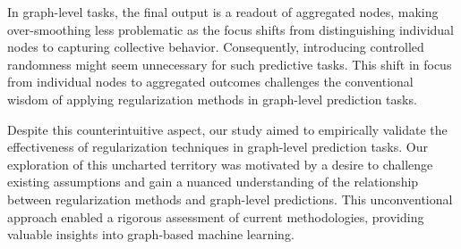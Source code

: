 In graph-level tasks, the final output is a readout of aggregated nodes, making over-smoothing less problematic as the focus shifts from distinguishing individual nodes to capturing collective behavior. Consequently, introducing controlled randomness might seem unnecessary for such predictive tasks. This shift in focus from individual nodes to aggregated outcomes challenges the conventional wisdom of applying regularization methods in graph-level prediction tasks.

Despite this counterintuitive aspect, our study aimed to empirically validate the effectiveness of regularization techniques in graph-level prediction tasks. Our exploration of this uncharted territory was motivated by a desire to challenge existing assumptions and gain a nuanced understanding of the relationship between regularization methods and graph-level predictions. This unconventional approach enabled a rigorous assessment of current methodologies, providing valuable insights into graph-based machine learning.

\newcommand*{\addstd}[4]{
    \addplot[name path=#3upper, draw=none] table[x=#2, y expr=\thisrow{#3Avg}+\thisrow{#3Std}, col sep=semicolon] {#1};
    \addplot[name path=#3lower, draw=none] table[x=#2, y expr=\thisrow{#3Avg}-\thisrow{#3Std}, col sep=semicolon] {#1};
    \addplot[fill=#4, fill opacity=0.1] fill between[of=#3upper and #3lower];
}
\newcommand*{\layerplot}[4]{\begin{tikzpicture}
        \begin{axis}[
                width=0.8\linewidth,
                height=6cm,
                xlabel={#3},
                ylabel={#4},
                legend pos=outer north east,
                legend style={nodes={scale=0.6, transform shape}},
                grid=major,
            ]

            \addplot[color= p_red] table [x=#2, y=noneAvg, col sep=semicolon] {#1};
            \addlegendentry{No Regularization}

            \addplot[color= p_green] table [x=#2, y=dropoutAvg, col sep=semicolon] {#1};
            \addlegendentry{Dropout}

            \addplot[color= p_blue] table [x=#2, y=nodesamplingAvg, col sep=semicolon] {#1};
            \addlegendentry{Node Sampling}

            \addplot[color= p_yellow] table [x=#2, y=dropedgeAvg, col sep=semicolon] {#1};
            \addlegendentry{DropEdge}

            \addplot[color= p_violet] table [x=#2, y=gdcAvg, col sep=semicolon] {#1};
            \addlegendentry{GDC}

            \addstd{#1}{#2}{none}{p_red}
            \addstd{#1}{#2}{dropout}{p_green}
            \addstd{#1}{#2}{nodesampling}{p_blue}
            \addstd{#1}{#2}{dropedge}{p_yellow}
            \addstd{#1}{#2}{gdc}{p_violet}
        \end{axis}
    \end{tikzpicture}}


